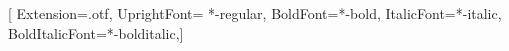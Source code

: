 \setmainfont{texgyrepagella}[
    Extension=.otf,
    UprightFont= *-regular,
    BoldFont=*-bold,
    ItalicFont=*-italic,
    BoldItalicFont=*-bolditalic,]